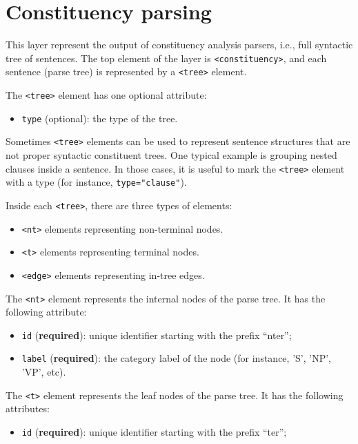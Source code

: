 \section{Constituency parsing}
\label{sec:constituency-parsing}

This layer represent the output of constituency analysis parsers, i.e., full
syntactic tree of sentences. The top element of the layer is
\texttt{<constituency>}, and each sentence (parse tree) is represented by a
\texttt{<tree>} element.

The \texttt{<tree>} element has one optional attribute:
\begin{itemize}
\item \texttt{type} (optional): the type of the tree. 
\end{itemize}

Sometimes \texttt{<tree>} elements can be used to represent sentence
structures that are not proper syntactic constituent trees. One typical
example is grouping nested clauses inside a sentence. In those cases, it is
useful to mark the \texttt{<tree>} element with a type (for instance,
\texttt{type="clause"}).

Inside each \texttt{<tree>}, there are three types of elements:
\begin{itemize}
\item \texttt{<nt>} elements representing non-terminal nodes.
\item \texttt{<t>} elements representing terminal nodes.
\item \texttt{<edge>} elements representing in-tree edges.
\end{itemize}

The \texttt{<nt>} element represents the internal nodes of the parse
tree. It has the following attribute:
\begin{itemize}
\item \texttt{id} (\textbf{required}): unique identifier starting with the
  prefix ``nter'';
\item \texttt{label} (\textbf{required}): the category label of the node
  (for instance, 'S', 'NP', 'VP', etc).
\end{itemize}

The \texttt{<t>} element represents the leaf nodes of the parse tree. It has
the following attributes:
\begin{itemize}
\item \texttt{id} (\textbf{required}): unique identifier starting with the
  prefix ``ter'';
\end{itemize}

